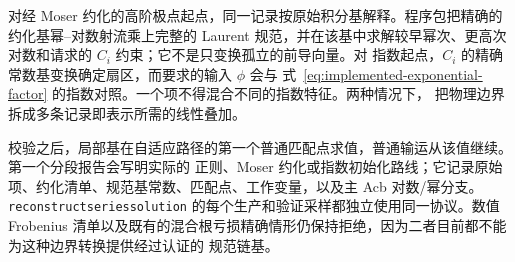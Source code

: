 \documentclass[11pt,a4paper]{ctexart}
\renewcommand{\_}{\origunderscore\allowbreak}
\begin{document}
对经 Moser 约化的高阶极点起点，同一记录按原始积分基解释。程序包把精确的约化基幂--对数射流乘上完整的
Laurent 规范，并在该基中求解较早幂次、更高次对数和请求的 $C_i$ 约束；它不是只变换孤立的前导向量。对
指数起点，$C_i$ 的精确常数基变换确定扇区，而要求的输入 $\phi$ 会与
式~\eqref{eq:implemented-exponential-factor} 的指数对照。一个项不得混合不同的指数特征。两种情况下，
把物理边界拆成多条记录即表示所需的线性叠加。

校验之后，局部基在自适应路径的第一个普通匹配点求值，普通输运从该值继续。第一个分段报告会写明实际的
正则、Moser 约化或指数初始化路线；它记录原始项、约化清单、规范基常数、匹配点、工作变量，以及主 Acb
对数/幂分支。\texttt{reconstruct\_series\_solution} 的每个生产和验证采样都独立使用同一协议。数值
Frobenius 清单以及既有的混合根亏损精确情形仍保持拒绝，因为二者目前都不能为这种边界转换提供经过认证的
规范链基。
\end{document}
